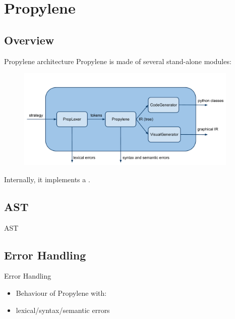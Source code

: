 \section{Propylene}

\subsection{Overview}
\begin{frame}{Propylene architecture}
  Propylene is made of several stand-alone modules:
  \begin{figure}[!h]
    \begin{center}
      \includegraphics[width=300pt]{img/propylene.pdf}
    \end{center}
  \end{figure}
  Internally, it implements a .
\end{frame}


\subsection{AST}
\begin{frame}{AST}  
    
%
\N\N
\end{frame}


\subsection{Error Handling}
\begin{frame}{Error Handling}
  \begin{itemize}
    \item Behaviour of Propylene with:
\N
    \item lexical/syntax/semantic errors
% 
  \end{itemize}
%
\N\N
\end{frame}


